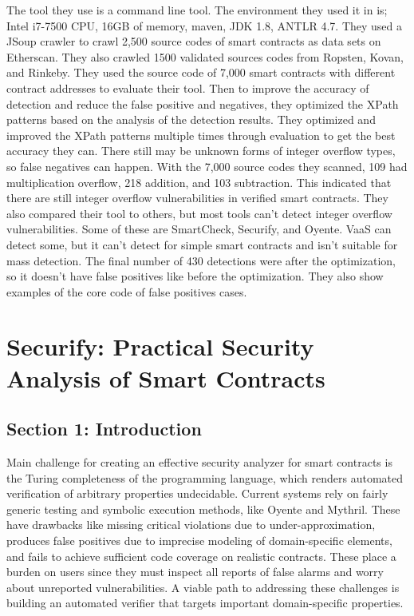 \documentclass{article}
\begin{document}
The tool they use is a command line tool. The environment they used it in is; Intel i7-7500 CPU, 16GB of
memory, maven, JDK 1.8, ANTLR 4.7. They used a JSoup crawler to crawl 2,500 source codes of smart contracts as data sets on Etherscan. They also crawled 1500 validated sources codes from Ropsten, Kovan, and Rinkeby. They used the source code of 7,000 smart contracts with different contract addresses to evaluate their tool. Then to improve the accuracy of detection and reduce the false positive and negatives, they optimized the XPath patterns based on the analysis of the detection results. They optimized and improved the XPath patterns multiple times through evaluation to get the best accuracy they can. There still may be unknown forms of integer overflow types, so false negatives can happen. With the 7,000 source codes they scanned, 109 had multiplication overflow, 218 addition, and 103 subtraction. This indicated that there are still integer overflow vulnerabilities in verified smart contracts. They also compared their tool to others, but most tools can't detect integer overflow vulnerabilities. Some of these are SmartCheck, Securify, and Oyente. VaaS can detect some, but it can't detect for simple smart contracts and isn't suitable for mass detection. The final number of 430 detections were after the optimization, so it doesn't have false positives like before the optimization. They also show examples of the core code of false positives cases.

\section{Securify: Practical Security Analysis of Smart Contracts \cite{Securify}}

\subsection{Section 1: Introduction}

Main challenge for creating an effective security analyzer for smart contracts is the Turing completeness of the programming language, which renders automated verification of arbitrary properties undecidable. Current systems rely on fairly generic testing and symbolic execution methods, like Oyente and Mythril. These have drawbacks like missing critical violations due to under-approximation, produces false positives due to imprecise modeling of domain-specific elements, and fails to achieve sufficient code coverage on realistic contracts. These place a burden on users since they must inspect all reports of false alarms and worry about unreported vulnerabilities. A viable path to addressing these challenges is building an automated verifier that targets important domain-specific properties.
\end{document}
